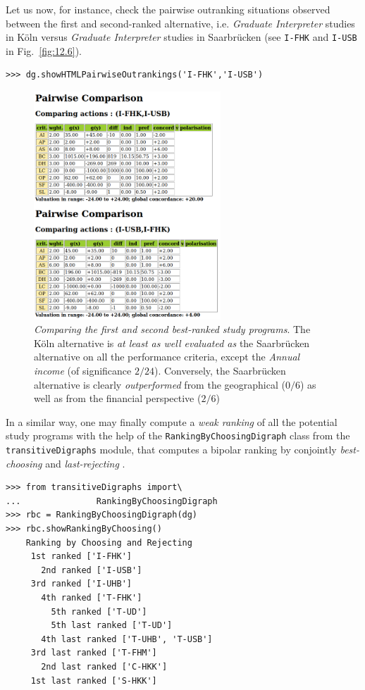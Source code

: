 Let us now, for instance, check the pairwise outranking situations observed between the first and second-ranked alternative, i.e. \emph{Graduate Interpreter} studies in Köln versus \emph{Graduate Interpreter} studies in Saarbrücken (see \texttt{I-FHK} and \texttt{I-USB} in Fig.~\vref{fig:12.6}).
\begin{lstlisting}
>>> dg.showHTMLPairwiseOutrankings('I-FHK','I-USB')
\end{lstlisting}
\begin{figure}[ht]
\sidecaption[t]
\includegraphics[width=7cm]{Figures/12-6-pairwiseComparison.png}
\caption[Comparing the first and second best-ranked study programs]{\emph{Comparing the first and second best-ranked study programs}. The Köln alternative is \emph{at least as well evaluated as} the Saarbrücken alternative on all the performance criteria, except the \emph{Annual income} (of significance $2/24$). Conversely, the Saarbrücken alternative is clearly \emph{outperformed} from the geographical ($0/6$) as well as from the financial perspective ($2/6$)}
\label{fig:12.6}       %
\end{figure}

In a similar way, one may finally compute a \emph{weak ranking} of all the potential study programs with the help of the \texttt{RankingByChoosingDigraph} class from the \texttt{transitiveDigraphs} module, that computes a bipolar ranking by conjointly \emph{best-choosing} and \emph{last-rejecting} \citep{BIS-1999}.
\begin{lstlisting}[caption={Weakly ranking by bipolar best-choosing and last-rejecting},label=list:12.6]
>>> from transitiveDigraphs import\
...               RankingByChoosingDigraph
>>> rbc = RankingByChoosingDigraph(dg)
>>> rbc.showRankingByChoosing()
    Ranking by Choosing and Rejecting
     1st ranked ['I-FHK'] 
       2nd ranked ['I-USB']
	 3rd ranked ['I-UHB']
	   4th ranked ['T-FHK']
	     5th ranked ['T-UD']
	     5th last ranked ['T-UD']
	   4th last ranked ['T-UHB', 'T-USB']
	 3rd last ranked ['T-FHM']
       2nd last ranked ['C-HKK']
     1st last ranked ['S-HKK']
\end{lstlisting}

